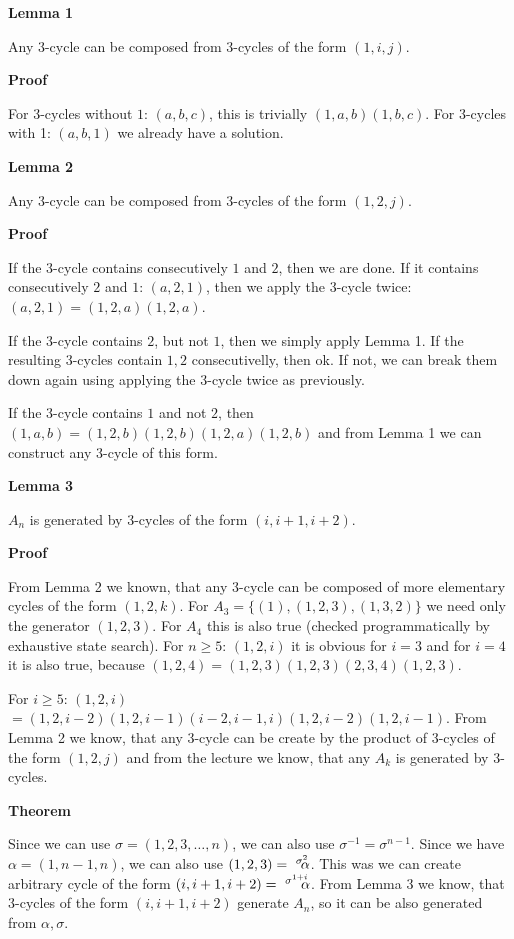 \documentclass[a4paper]{article}
\begin{document}
\textbf{Lemma 1}

Any 3-cycle can be composed from 3-cycles of the form $(1, i, j)$.

\textbf{Proof}

For 3-cycles without $1$: $(a, b, c)$, this is trivially $(1, a, b)(1, b, c)$. For 3-cycles with 1: $(a, b, 1)$ we already have a solution.

\textbf{Lemma 2}

Any 3-cycle can be composed from 3-cycles of the form $(1, 2, j)$.

\textbf{Proof}

If the 3-cycle contains consecutively $1$ and $2$, then we are done. If it contains consecutively $2$ and $1$: $(a, 2, 1)$, then we apply the 3-cycle twice: $(a, 2, 1) = (1, 2, a)(1, 2, a)$.

If the 3-cycle contains $2$, but not $1$, then we simply apply Lemma 1. If the resulting 3-cycles contain $1, 2$ consecutivelly, then ok. If not, we can break them down again using applying the 3-cycle twice as previously.

If the 3-cycle contains $1$ and not $2$, then $(1, a, b) = (1, 2, b)(1, 2, b)(1, 2, a)(1, 2, b)$ and from Lemma 1 we can construct any 3-cycle of this form.

\textbf{Lemma 3}

$A_n$ is generated by 3-cycles of the form $(i, i+1, i+2)$.

\textbf{Proof}

From Lemma 2 we known, that any 3-cycle can be composed of more elementary cycles of the form $(1, 2, k)$. For $A_3 = \{ (1), (1, 2, 3), (1, 3, 2) \}$ we need only the generator $(1, 2, 3)$. For $A_4$ this is also true (checked programmatically by exhaustive state search). For $n \ge 5$: $(1, 2, i)$ it is obvious for $i = 3$ and for $i = 4$ it is also true, because $(1, 2, 4) = (1, 2, 3)(1, 2, 3)(2, 3, 4)(1, 2, 3)$.

For $i\ge 5$: $(1, 2, i)$ $= (1, 2, i-2)(1, 2, i -1)(i-2, i-1, i)(1, 2, i-2)(1, 2, i-1)$. From Lemma 2 we know, that any 3-cycle can be create by the product of 3-cycles of the form $(1, 2, j)$ and from the lecture we know, that any $A_k$ is generated by 3-cycles.


\textbf{Theorem}

Since we can use $\sigma = (1, 2, 3, \ldots, n)$, we can also use $\sigma^{-1} = \sigma^{n-1}$. Since we have $\alpha = (1, n-1, n)$, we can also use $(1, 2, 3) =\ ^{\sigma^2}\hspace{-0.2cm}\alpha$. This was we can create arbitrary cycle of the form $(i, i+1, i+2) = \ ^{\sigma^{1+i}}\hspace{-0.2cm}\alpha$. From Lemma 3 we know, that 3-cycles of the form $(i, i+1, i+2)$ generate $A_n$, so it can be also generated from $\alpha, \sigma$.
\end{document}
